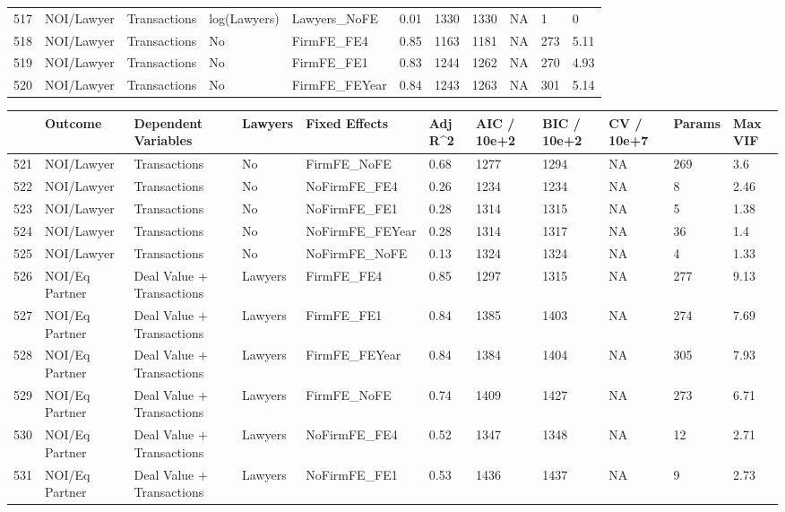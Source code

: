 \documentclass{article}
\begin{document}
\begin{table}[H]
\begin{tabular}{rllllllllll}
  517 & NOI/Lawyer & Transactions & log(Lawyers) & Lawyers\_NoFE & 0.01 & 1330 & 1330 & NA & 1 & 0 \\ 
  518 & NOI/Lawyer & Transactions & No & FirmFE\_FE4 & 0.85 & 1163 & 1181 & NA & 273 & 5.11 \\ 
  519 & NOI/Lawyer & Transactions & No & FirmFE\_FE1 & 0.83 & 1244 & 1262 & NA & 270 & 4.93 \\ 
  520 & NOI/Lawyer & Transactions & No & FirmFE\_FEYear & 0.84 & 1243 & 1263 & NA & 301 & 5.14 \\ 
   \hline
\end{tabular}
\end{table}
\begin{table}[H]
\centering
\begin{tabular}{rllllllllll}
  \hline
 & Outcome & Dependent Variables & Lawyers & Fixed Effects & Adj R^2 & AIC / 10e+2 & BIC / 10e+2 & CV / 10e+7 & Params & Max VIF \\ 
  \hline
521 & NOI/Lawyer & Transactions & No & FirmFE\_NoFE & 0.68 & 1277 & 1294 & NA & 269 & 3.6 \\ 
  522 & NOI/Lawyer & Transactions & No & NoFirmFE\_FE4 & 0.26 & 1234 & 1234 & NA & 8 & 2.46 \\ 
  523 & NOI/Lawyer & Transactions & No & NoFirmFE\_FE1 & 0.28 & 1314 & 1315 & NA & 5 & 1.38 \\ 
  524 & NOI/Lawyer & Transactions & No & NoFirmFE\_FEYear & 0.28 & 1314 & 1317 & NA & 36 & 1.4 \\ 
  525 & NOI/Lawyer & Transactions & No & NoFirmFE\_NoFE & 0.13 & 1324 & 1324 & NA & 4 & 1.33 \\ 
  526 & NOI/Eq Partner & Deal Value + Transactions & Lawyers & FirmFE\_FE4 & 0.85 & 1297 & 1315 & NA & 277 & 9.13 \\ 
  527 & NOI/Eq Partner & Deal Value + Transactions & Lawyers & FirmFE\_FE1 & 0.84 & 1385 & 1403 & NA & 274 & 7.69 \\ 
  528 & NOI/Eq Partner & Deal Value + Transactions & Lawyers & FirmFE\_FEYear & 0.84 & 1384 & 1404 & NA & 305 & 7.93 \\ 
  529 & NOI/Eq Partner & Deal Value + Transactions & Lawyers & FirmFE\_NoFE & 0.74 & 1409 & 1427 & NA & 273 & 6.71 \\ 
  530 & NOI/Eq Partner & Deal Value + Transactions & Lawyers & NoFirmFE\_FE4 & 0.52 & 1347 & 1348 & NA & 12 & 2.71 \\ 
  531 & NOI/Eq Partner & Deal Value + Transactions & Lawyers & NoFirmFE\_FE1 & 0.53 & 1436 & 1437 & NA & 9 & 2.73 \\ 

\end{tabular}
\end{table}
\end{document}
